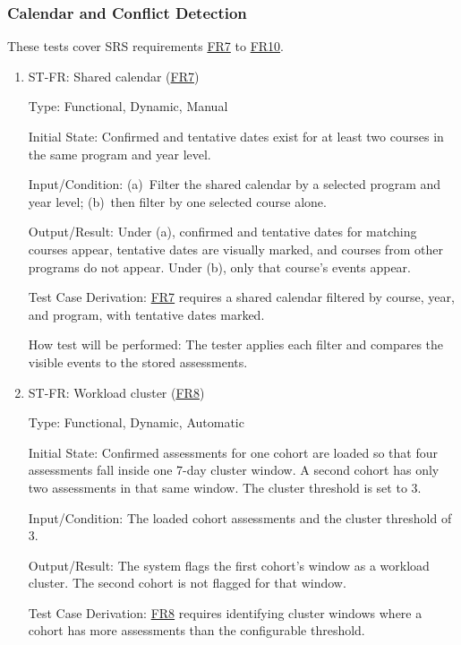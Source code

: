 \documentclass[12pt, titlepage]{article}
\newcounter{stnum}
\newcommand{\frlink}[1]{\href{https://github.com/shivyam/cas-course-optimization/blob/main/pdfs/SRS-IEEE/SRS.pdf}{FR#1}}
\begin{document}
\subsubsection{Calendar and Conflict Detection}

These tests cover SRS requirements \frlink{7} to \frlink{10}.

\begin{enumerate}

\item{ST-FR\thestnum \label{ST_Calendar}: Shared calendar (\frlink{7})\\}

Type: Functional, Dynamic, Manual

Initial State: Confirmed and tentative dates exist for at least two courses in the same program and year level.

Input/Condition: (a)~Filter the shared calendar by a selected program and year level; (b)~then filter by one selected course alone.

Output/Result: Under (a), confirmed and tentative dates for matching courses appear, tentative dates are visually marked, and courses from other programs do not appear. Under (b), only that course's events appear.

Test Case Derivation: \frlink{7} requires a shared calendar filtered by course, year, and program, with tentative dates marked.

How test will be performed: The tester applies each filter and compares the visible events to the stored assessments.


\item{ST-FR\thestnum \label{ST_Work_Cluster}: Workload cluster (\frlink{8})\\}

Type: Functional, Dynamic, Automatic

Initial State: Confirmed assessments for one cohort are loaded so that four assessments fall inside one 7-day cluster window. A second cohort has only two assessments in that same window. The cluster threshold is set to 3.

Input/Condition: The loaded cohort assessments and the cluster threshold of 3.

Output/Result: The system flags the first cohort's window as a workload cluster. The second cohort is not flagged for that window.

Test Case Derivation: \frlink{8} requires identifying cluster windows where a cohort has more assessments than the configurable threshold.


\end{enumerate}
\end{document}
